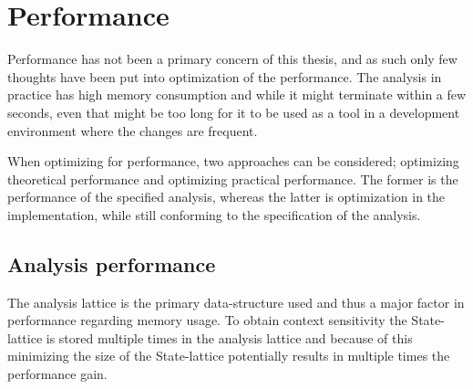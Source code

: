 \newpage
\section{Performance}
\label{sec:future3}
Performance has not been a primary concern of this thesis, and as such only few thoughts have been put into optimization of the performance. The analysis in practice has high memory consumption and while it might terminate within a few seconds, even that might be too long for it to be used as a tool in a development environment where the changes are frequent.  

When optimizing for performance, two approaches can be considered; optimizing theoretical performance and optimizing practical performance. The former is the performance of the specified analysis, whereas the latter is optimization in the implementation, while still conforming to the specification of the analysis.

\subsection{Analysis performance}
The analysis lattice is the primary data-structure used and thus a major factor in performance regarding memory usage. To obtain context sensitivity the State-lattice is stored multiple times in the analysis lattice and because of this minimizing the size of the State-lattice potentially results in multiple times the performance gain.

